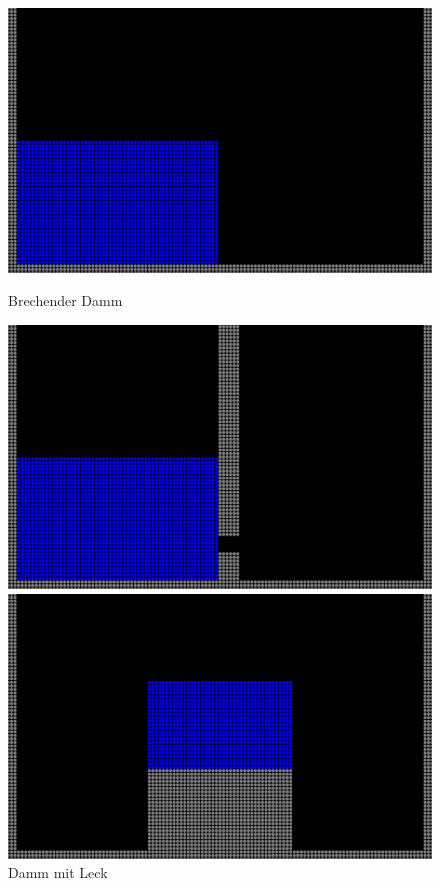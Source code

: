 \documentclass[11pt,
a4paper,
parskip=half, %
BCOR=10mm, %
english,
ngerman]{scrreprt}
\begin{document}
\begin{figure}[htb]
    \begin{minipage}[t]{0.45\textwidth}
        \includegraphics[width=\textwidth]{Dammbruch.png}
        \caption{Brechender Damm}
        \label{image:breaking_dam}
    \end{minipage}
    \begin{minipage}[t]{0.45\textwidth}
        \includegraphics[width=\textwidth]{Dammleck.png}
        \caption{Damm mit Leck}
        \label{image:leaking_dam}
    \end{minipage}
    \begin{minipage}[t]{0.45\textwidth}
        \includegraphics[width=\textwidth]{Fallend.png}

\end{minipage}
\end{figure}
\end{document}
